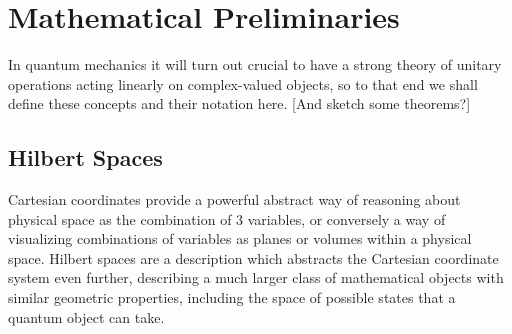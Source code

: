 
\chapter[MATHEMATICAL PRELIMINARIES]{Mathematical Preliminaries}
\label{Chap:Math}
In quantum mechanics it will turn out crucial to have a strong theory of unitary operations acting linearly on complex-valued objects, so to that end we shall define these concepts and their notation here. [And sketch some theorems?]
\section{Hilbert Spaces}
Cartesian coordinates provide a powerful abstract way of reasoning about physical space as the combination of 3 variables, or conversely a way of visualizing combinations of variables as planes or volumes within a physical space. Hilbert spaces are a description which abstracts the Cartesian coordinate system even further, describing a much larger class of mathematical objects with similar geometric properties, including the space of possible states that a quantum object can take.

